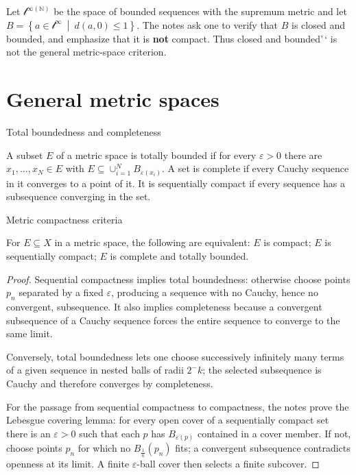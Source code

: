 \begin{example}

Let \(\mathcal{l}^{\infty{(\mathbb{N})}}\) be the space of bounded sequences with the supremum metric and let \(B = \left\{ a \in \mathcal{l}^{\infty}\  \middle| \ d\left( {a,0} \right) \leq 1 \right\}\). The notes ask one to verify that \(B\) is closed and bounded, and emphasize that it is \textbf{not} compact. Thus closed and bounded'\,` is not the general metric-space criterion.

\end{example}

\section{General metric spaces}

\begin{definition}{Total boundedness and completeness}

A subset \(E\) of a metric space is totally bounded if for every \(\varepsilon > 0\) there are \(x_{1},\ldots,x_{N} \in E\) with \(E \subseteq \cup_{i = 1}^{N}B_{\varepsilon{(x_{i})}}\). A set is complete if every Cauchy sequence in it converges to a point of it. It is sequentially compact if every sequence has a subsequence converging in the set.

\end{definition}

\begin{theorem}{Metric compactness criteria}

For \(E \subseteq X\) in a metric space, the following are equivalent: \(E\) is compact; \(E\) is sequentially compact; \(E\) is complete and totally bounded.

\end{theorem}

\begin{proof}

Sequential compactness implies total boundedness: otherwise choose points \(p_{n}\) separated by a fixed \(\varepsilon\), producing a sequence with no Cauchy, hence no convergent, subsequence. It also implies completeness because a convergent subsequence of a Cauchy sequence forces the entire sequence to converge to the same limit.

Conversely, total boundedness lets one choose successively infinitely many terms of a given sequence in nested balls of radii \(2^{-}k\); the selected subsequence is Cauchy and therefore converges by completeness.

For the passage from sequential compactness to compactness, the notes prove the Lebesgue covering lemma: for every open cover of a sequentially compact set there is an \(\varepsilon > 0\) such that each \(p\) has \(B_{\varepsilon{(p)}}\) contained in a cover member. If not, choose points \(p_{n}\) for which no \(B_{\frac{1}{n}}\left( p_{n} \right)\) fits; a convergent subsequence contradicts openness at its limit. A finite \(\varepsilon\)-ball cover then selects a finite subcover.

\end{proof}
